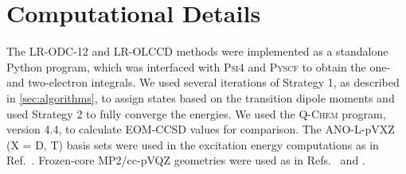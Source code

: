 \section{Computational Details}

The LR-ODC-12 and LR-OLCCD methods were implemented as a standalone Python
program, which was interfaced with \textsc{Psi4}\cite{Parrish:2017p3185} and
\textsc{Pyscf}\cite{Sun:2018pe1340} to obtain the one- and two-electron
integrals.
We used several iterations of Strategy 1, as described in \cref{sec:algorithms},
to assign states based on the transition dipole moments and used Strategy 2 to
fully converge the energies.
We used the \textsc{Q-Chem} program, version 4.4,\cite{QChem} to calculate
EOM-CCSD values for comparison.
The ANO-L-pVXZ (X = D, T) basis sets\cite{Widmark:1990p291} were used in the
excitation energy computations as in Ref.~.
Frozen-core MP2/cc-pVQZ geometries were used as in
Refs.~ and .


